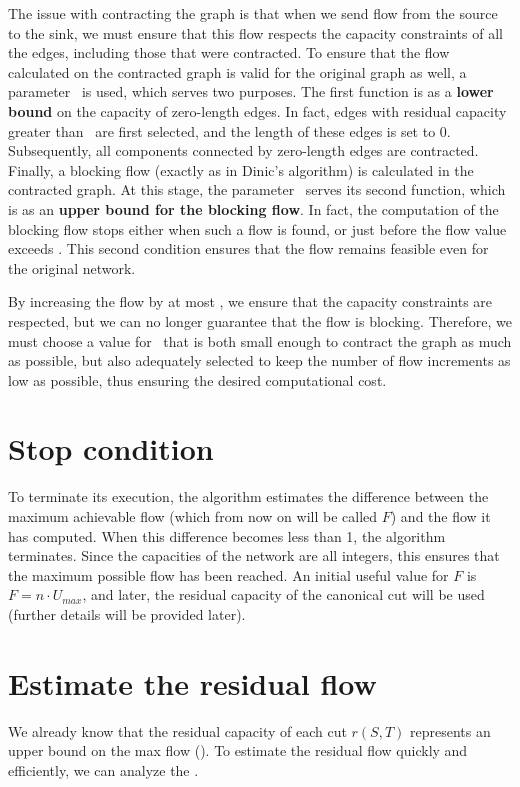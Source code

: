     The issue with contracting the graph is that when we send flow from the source to the sink, we must ensure that this flow respects the capacity constraints of all the edges, including those that were contracted.  
    To ensure that the flow calculated on the contracted graph is valid for the original graph as well, a parameter \dlt\ is used, which serves two purposes. The first function is as a \textbf{lower bound} on the capacity of zero-length edges.  
    In fact, edges with residual capacity greater than \dlt\ are first selected, and the length of these edges is set to 0.  
    Subsequently, all components connected by zero-length edges are contracted.  
    Finally, a blocking flow (exactly as in Dinic's algorithm) is calculated in the contracted graph.  
    At this stage, the parameter \dlt\ serves its second function, which is as an \textbf{upper bound for the blocking flow}. In fact, the computation of the blocking flow stops either when such a flow is found, or just before the flow value exceeds \dlt. This second condition ensures that the flow remains feasible even for the original network.

    By increasing the flow by at most \dlt, we ensure that the capacity constraints are respected, but we can no longer guarantee that the flow is blocking.  
    Therefore, we must choose a value for \dlt\ that is both small enough to contract the graph as much as possible, but also adequately selected to keep the number of flow increments as low as possible, thus ensuring the desired computational cost.

\section{Stop condition}
    To terminate its execution, the algorithm estimates the difference between the maximum achievable flow (which from now on will be called $F$) and the flow it has computed.
    When this difference becomes less than 1, the algorithm terminates.
    Since the capacities of the network are all integers, this ensures that the maximum possible flow has been reached.
    An initial useful value for $F$ is $F=n\cdot U_{max}$, and later, the residual capacity of the canonical cut will be used (further details will be provided later).


\section{Estimate the residual flow}
    We already know that the residual capacity of each cut $r(S,T)$ represents an upper bound on the max flow ().
    To estimate the residual flow quickly and efficiently, we can analyze the .

